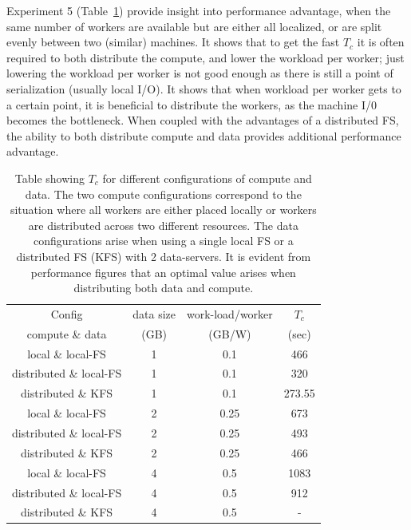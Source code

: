 \documentclass[conference,final]{IEEEtran}
\newcommand{\jhanote}[1]{ {\textcolor{red} { ***SJ: #1 }}}
\newcommand{\jhanote}[1]{}
\newcommand{\tc }{ $T_c$ }
\begin{document}
Experiment 5 (Table~\ref{exp4and5}) provide insight into performance
advantage, when the same number of workers are available but are
either all localized, or are split evenly between two (similar)
machines. It shows that to get the fast \tc it is often required to
both distribute the compute, and lower the workload per worker; just
lowering the workload per worker is not good enough as there is still
a point of serialization (usually local I/O).  It shows that when
workload per worker gets to a certain point, it is beneficial to
distribute the workers, as the machine I/0 becomes the bottleneck.
When coupled with the advantages of a distributed FS, the ability to
both distribute compute and data provides additional performance
advantage.

\begin{table}
\begin{tabular}{cccc}
  \hline
  Config  &  data size   &   work-load/worker & $T_c$  \\
  compute \& data &   (GB)  & (GB/W) & (sec) \\
  \hline
  local \& local-FS & 1 & 0.1 & 466 \\
  \hline
  distributed \& local-FS & 1 & 0.1 & 320 \\
  \hline
  distributed \& KFS & 1 & 0.1 &  273.55 \\
  \hline \hline
  local \& local-FS & 2 & 0.25 & 673 \\
  \hline 
  distributed \& local-FS & 2 & 0.25 & 493 \\
  \hline
  distributed \& KFS & 2 & 0.25 &  466 \\
  \hline \hline
  local \& local-FS &  4 & 0.5 & 1083\\
  \hline
  distributed \& local-FS &  4 &  0.5&  912 \\
  \hline
  distributed \& KFS & 4 & 0.5 &  -  \\
  \hline \hline
\end{tabular}
\caption{Table showing \tc for different configurations of compute  
  and data. The two compute configurations correspond to the situation
  where all workers are either
  placed locally or  workers are distributed across two different resources. The data configurations arise when using a single local FS  or a distributed FS  (KFS) with 2 data-servers. It is evident from performance figures that an optimal value arises when distributing both data and compute.}\label{exp4and5}
\end{table}
\end{document}
